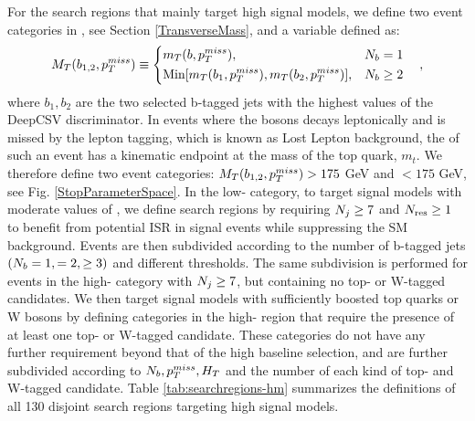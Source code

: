 For the search regions that mainly target high \dm{} signal models, we define two event categories in \mtb, see Section \ref{TransverseMass}, and a variable defined as:
\begin{equation}
M_{T}(b_{1,2},p_{T}^{miss})\equiv
\begin{cases}
\begin{split}
& m_T(b,p_{T}^{miss}), &N_{b}=1 \\
& \text{Min}[m_T(b_1, p_{T}^{miss}),m_T(b_2,p_{T}^{miss})], &N_{b}\geq2 \\
\end{split}
\end{cases},
\end{equation}
where $b_1, b_2$ are the two selected b-tagged jets with the highest values of the DeepCSV discriminator. In \ttbar{} events where the \W{} bosons decays leptonically and is missed by the lepton tagging, which is known as Lost Lepton background, the \mtb of such an event has a kinematic endpoint at the mass of the top quark, $m_t$.
We therefore define two event categories: $M_{T}(b_{1,2},p_{T}^{miss})>175$ GeV and $< 175$ GeV, see Fig. \ref{StopParameterSpace}. In the low-\mtb{} category, to target signal models with moderate values of \dm, we define search regions by requiring $N_{j}\geq7$ and $N_{\text{res}}\geq1$ to benefit from potential ISR in signal events while suppressing the SM background. Events are then subdivided according to the number of b-tagged jets $(N_{b}=1,=2,\geq3)$ and different \met{} thresholds. The same subdivision is performed for events in the high-\mtb{} category with $N_{j}\geq7$, but containing no top- or W-tagged candidates. We then target signal models with sufficiently boosted top quarks or W bosons by defining categories in the high-\mtb{} region that require the presence of at least one top- or W-tagged candidate. These categories do not have any further \nj{} requirement beyond that of the high \dm{} baseline selection, and are further subdivided according to $N_{b}, p_{T}^{miss}, H_{T}$ and the number of each kind of top- and W-tagged candidate. Table \ref{tab:searchregions-hm} summarizes the definitions of all 130 disjoint search regions targeting high \dm{} signal models.

